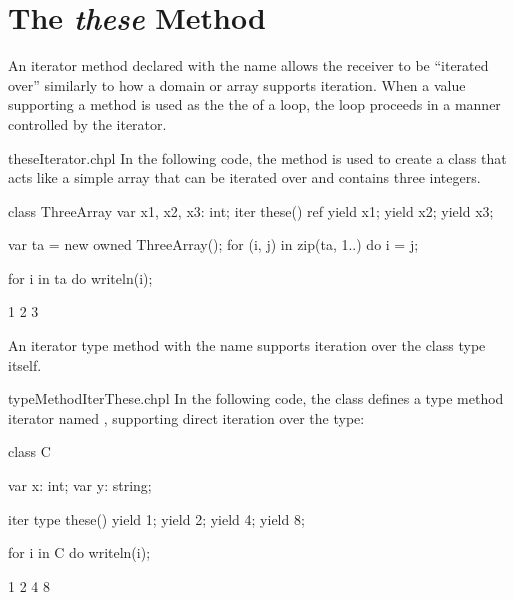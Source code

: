 \section{The {\em these} Method}
\label{The_these_Method}

An iterator method declared with the name  allows the
receiver to be ``iterated over'' similarly to how a domain or array
supports iteration. When a value supporting a  method
is used as the the  of a loop, the
loop proceeds in a manner controlled by the  iterator.

\begin{chapelexample}{theseIterator.chpl}
In the following code, the  method is used to create a
class that acts like a simple array that can be iterated over and
contains three integers.
\begin{chapel}
class ThreeArray {
  var x1, x2, x3: int;
  iter these() ref {
    yield x1;
    yield x2;
    yield x3;
  }
}
\end{chapel}
\begin{chapelpost}
var ta = new owned ThreeArray();
for (i, j) in zip(ta, 1..) do
  i = j;

for i in ta do
  writeln(i);
\end{chapelpost}
\begin{chapeloutput}
1
2
3
\end{chapeloutput}

\end{chapelexample}

An iterator type method with the name  supports iteration
over the class type itself.

\begin{chapelexample}{typeMethodIterThese.chpl}
In the following code, the class  defines a type method
iterator named , supporting direct iteration over the type:
\begin{chapel}
class C {
  var x: int;
  var y: string;

  iter type these() {
    yield 1;
    yield 2;
    yield 4;
    yield 8;
  }
}

for i in C do
  writeln(i);
\end{chapel}
\begin{chapeloutput}
1
2
4
8
\end{chapeloutput}
\end{chapelexample}
